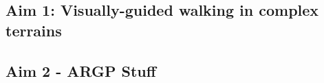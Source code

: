 
\subsection{Aim 1: Visually-guided walking in complex terrains}





\subsection{Aim 2 - ARGP Stuff}

